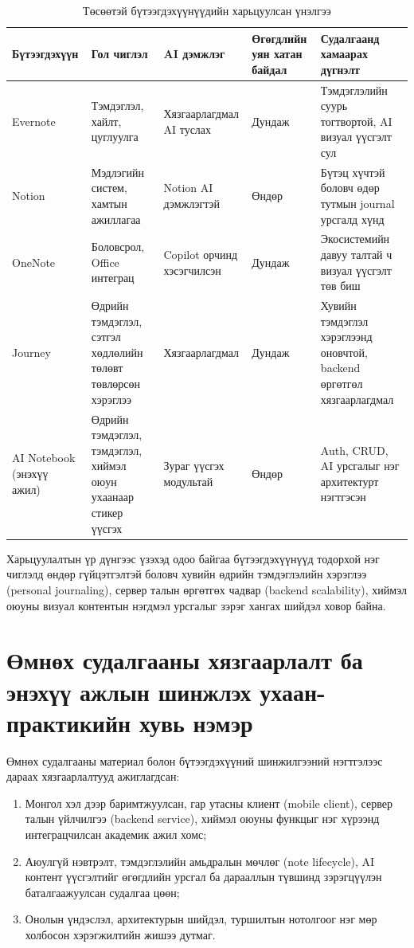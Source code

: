\begin{table}[H]
\centering
\caption{Төсөөтэй бүтээгдэхүүнүүдийн харьцуулсан үнэлгээ}
\label{tab:product_comparison}
\footnotesize
\setlength{\tabcolsep}{4pt}
\renewcommand{\arraystretch}{1.15}
\begin{tabularx}{\textwidth}{>{\raggedright\arraybackslash}p{2.1cm}>{\raggedright\arraybackslash}X>{\raggedright\arraybackslash}p{2.6cm}>{\centering\arraybackslash}p{1.7cm}>{\raggedright\arraybackslash}X}
\toprule
\textbf{Бүтээгдэхүүн} & \textbf{Гол чиглэл} & \textbf{AI дэмжлэг} & \textbf{Өгөгдлийн уян хатан байдал} & \textbf{Судалгаанд хамаарах дүгнэлт} \\
\midrule
Evernote & Тэмдэглэл, хайлт, цуглуулга & Хязгаарлагдмал AI туслах & Дундаж & Тэмдэглэлийн суурь тогтвортой, AI визуал үүсгэлт сул \\
Notion & Мэдлэгийн систем, хамтын ажиллагаа & Notion AI дэмжлэгтэй & Өндөр & Бүтэц хүчтэй боловч өдөр тутмын journal урсгалд хүнд \\
OneNote & Боловсрол, Office интеграц & Copilot орчинд хэсэгчилсэн & Дундаж & Экосистемийн давуу талтай ч визуал үүсгэлт төв биш \\
Journey & Өдрийн тэмдэглэл, сэтгэл хөдлөлийн төлөвт төвлөрсөн хэрэглээ & Хязгаарлагдмал & Дундаж & Хувийн тэмдэглэл хэрэглээнд оновчтой, backend өргөтгөл хязгаарлагдмал \\
AI Notebook (энэхүү ажил) & Өдрийн тэмдэглэл, тэмдэглэл, хиймэл оюун ухаанаар стикер үүсгэх & Зураг үүсгэх модультай & Өндөр & Auth, CRUD, AI урсгалыг нэг архитектурт нэгтгэсэн \\
\bottomrule
\end{tabularx}
\end{table}

Харьцуулалтын үр дүнгээс үзэхэд одоо байгаа бүтээгдэхүүнүүд тодорхой нэг чиглэлд өндөр гүйцэтгэлтэй боловч хувийн өдрийн тэмдэглэлийн хэрэглээ (personal journaling), сервер талын өргөтгөх чадвар (backend scalability), хиймэл оюуны визуал контентын нэгдмэл урсгалыг зэрэг хангах шийдэл ховор байна.

\section{Өмнөх судалгааны хязгаарлалт ба энэхүү ажлын шинжлэх ухаан-практикийн хувь нэмэр}

Өмнөх судалгааны материал болон бүтээгдэхүүний шинжилгээний нэгтгэлээс дараах хязгаарлалтууд ажиглагдсан:

\begin{enumerate}
    \item Монгол хэл дээр баримтжуулсан, гар утасны клиент (mobile client), сервер талын үйлчилгээ (backend service), хиймэл оюуны функцыг нэг хүрээнд интеграцчилсан академик ажил хомс;
    \item Аюулгүй нэвтрэлт, тэмдэглэлийн амьдралын мөчлөг (note lifecycle), AI контент үүсгэлтийг өгөгдлийн урсгал ба дарааллын түвшинд зэрэгцүүлэн баталгаажуулсан судалгаа цөөн;
    \item Онолын үндэслэл, архитектурын шийдэл, туршилтын нотолгоог нэг мөр холбосон хэрэгжилтийн жишээ дутмаг.
\end{enumerate}

